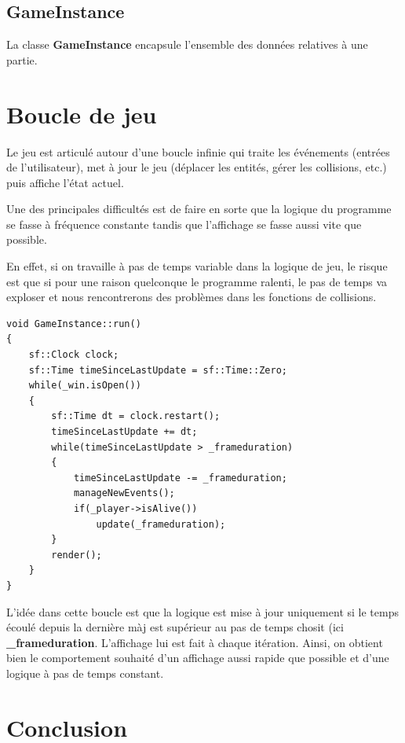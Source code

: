 \documentclass{article}
\begin{document}
\subsection{GameInstance}

La classe \textbf{GameInstance} encapsule l'ensemble des données relatives à une partie.










\section{Boucle de jeu}

Le jeu est articulé autour d'une boucle infinie qui traite les événements (entrées de l'utilisateur), met à jour le jeu (déplacer les entités, gérer les collisions, etc.) puis affiche l'état actuel.

Une des principales difficultés est de faire en sorte que la logique du programme se fasse à fréquence constante tandis que l'affichage se fasse aussi vite que possible.

En effet, si on travaille à pas de temps variable dans la logique de jeu, le risque est que si pour une raison quelconque le programme ralenti, le pas de temps va exploser et nous rencontrerons des problèmes dans les fonctions de collisions.


\begin{verbatim} 
void GameInstance::run()
{
    sf::Clock clock;
    sf::Time timeSinceLastUpdate = sf::Time::Zero;
    while(_win.isOpen())
    {
        sf::Time dt = clock.restart();
        timeSinceLastUpdate += dt;
        while(timeSinceLastUpdate > _frameduration)
        {
            timeSinceLastUpdate -= _frameduration;
            manageNewEvents();
            if(_player->isAlive())
                update(_frameduration);
        }
        render();
    }
}
\end{verbatim}

L'idée dans cette boucle est que la logique est mise à jour uniquement si le temps écoulé depuis la dernière màj est supérieur au pas de temps chosit (ici \textbf{\_frameduration}. L'affichage lui est fait à chaque itération. Ainsi, on obtient bien le comportement souhaité d'un affichage aussi rapide que possible et d'une logique à pas de temps constant.


\section{Conclusion}
\end{document}
